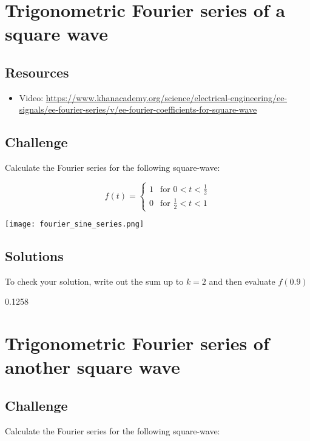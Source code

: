 \newpage
\section{Trigonometric Fourier series of a square wave}
\label{sec:1stsqwch}

\subsection*{Resources}
\begin{itemize}
    \item Video: \url{https://www.khanacademy.org/science/electrical-engineering/ee-signals/ee-fourier-series/v/ee-fourier-coefficients-for-square-wave}
\end{itemize}

\subsection*{Challenge}
Calculate the Fourier series for the following square-wave:

\begin{equation}
   f(t) =
   \begin{cases}
       1 & \text{for } 0 < t < \frac{1}{2} \\
       0 & \text{for } \frac{1}{2} < t < 1
   \end{cases} 
\end{equation}

\texttt{[image: fourier\_sine\_series.png]}

\subsection*{Solutions}
To check your solution, write out the sum up to $k=2$ and then evaluate $f(0.9)$

0.1258



\newpage
\section{Trigonometric Fourier series of another square wave}
\label{sec:2ndsqwch}

\subsection*{Challenge}
Calculate the Fourier series for the following square-wave:

